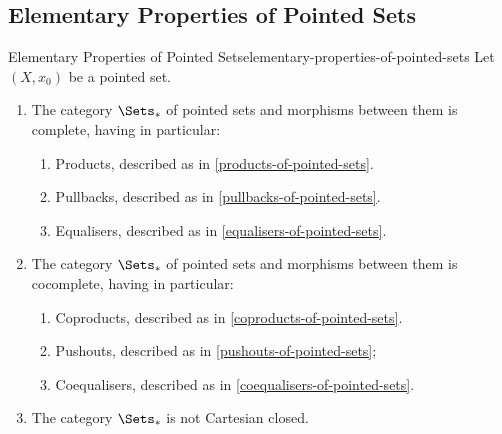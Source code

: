 \subsection{Elementary Properties of Pointed Sets}\label{subsection-elementary-properties-of-pointed-sets}
\begin{proposition}{Elementary Properties of Pointed Sets}{elementary-properties-of-pointed-sets}%
    Let $(X,x_{0})$ be a pointed set.
    \begin{enumerate}
        \item\label{elementary-properties-of-pointed-sets-completeness}The category $\Sets_{*}$ of pointed sets and morphisms between them is complete, having in particular:
            \begin{enumerate}
                \item\label{elementary-properties-of-pointed-sets-completeness-products}Products, described as in \cref{products-of-pointed-sets}.
                \item\label{elementary-properties-of-pointed-sets-completeness-pullbacks}Pullbacks, described as in \cref{pullbacks-of-pointed-sets}.
                \item\label{elementary-properties-of-pointed-sets-completeness-equalisers}Equalisers, described as in \cref{equalisers-of-pointed-sets}.
            \end{enumerate}
        \item\label{elementary-properties-of-pointed-sets-cocompleteness}The category $\Sets_{*}$ of pointed sets and morphisms between them is cocomplete, having in particular:
            \begin{enumerate}
                \item\label{elementary-properties-of-pointed-sets-completeness-coproduct}Coproducts, described as in \cref{coproducts-of-pointed-sets}.
                \item\label{elementary-properties-of-pointed-sets-completeness-pushouts}Pushouts, described as in \cref{pushouts-of-pointed-sets};
                \item\label{elementary-properties-of-pointed-sets-completeness-coequalisers}Coequalisers, described as in \cref{coequalisers-of-pointed-sets}.
            \end{enumerate}
        \item\label{elementary-properties-of-pointed-sets-failure-to-be-cartesian-closed}The category $\Sets_{*}$ is not Cartesian closed.%

\end{enumerate}
\end{proposition}
